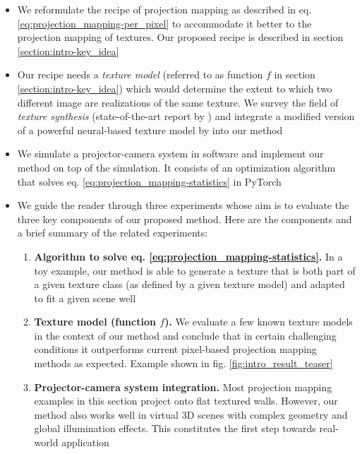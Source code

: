 \begin{itemize}
    \item We reformulate the recipe of projection mapping as described in eq. \ref{eq:projection_mapping-per_pixel} to accommodate it better to the projection mapping of textures. Our proposed recipe is described in section \ref{section:intro-key_idea}
    \item Our recipe needs a \textit{texture model} (referred to as function \(f\) in section \ref{section:intro-key_idea}) which would determine the extent to which two different image are realizations of the same texture. We survey the field of \textit{texture synthesis} (state-of-the-art report by \citet{Raad2018}) and integrate a modified version of a powerful neural-based texture model by \citet{Gatys2015} into our method
    \item We simulate a projector-camera system in software and implement our method on top of the simulation. It consists of an optimization algorithm that solves eq. \ref{eq:projection_mapping-statistics} in PyTorch
    \item We guide the reader through three experiments whose aim is to evaluate the three key components of our proposed method. Here are the components and a brief summary of the related experiments:
    \begin{enumerate}
        \item \textbf{Algorithm to solve eq. \ref{eq:projection_mapping-statistics}.} In a toy example, our method is able to generate a texture that is both part of a given texture class (as defined by a given texture model) and adapted to fit a given scene well
        \item \textbf{Texture model (function \(f\)).} We evaluate a few known texture models in the context of our method and conclude that in certain challenging conditions it outperforms current pixel-based projection mapping methods as expected. Example shown in fig. \ref{fig:intro_result_teaser}
        \item \textbf{Projector-camera system integration.} Most projection mapping examples in this section project onto flat textured walls. However, our method also works well in virtual 3D scenes with complex geometry and global illumination effects. This constitutes the first step towards real-world application
    \end{enumerate}
\end{itemize}


